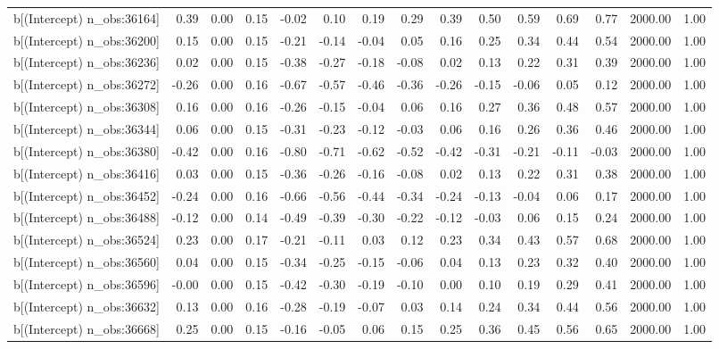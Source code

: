 \begin{table}[ht]
\begin{tabular}{rrrrrrrrrrrrrrr}
  b[(Intercept) n\_obs:36164] & 0.39 & 0.00 & 0.15 & -0.02 & 0.10 & 0.19 & 0.29 & 0.39 & 0.50 & 0.59 & 0.69 & 0.77 & 2000.00 & 1.00 \\ 
  b[(Intercept) n\_obs:36200] & 0.15 & 0.00 & 0.15 & -0.21 & -0.14 & -0.04 & 0.05 & 0.16 & 0.25 & 0.34 & 0.44 & 0.54 & 2000.00 & 1.00 \\ 
  b[(Intercept) n\_obs:36236] & 0.02 & 0.00 & 0.15 & -0.38 & -0.27 & -0.18 & -0.08 & 0.02 & 0.13 & 0.22 & 0.31 & 0.39 & 2000.00 & 1.00 \\ 
  b[(Intercept) n\_obs:36272] & -0.26 & 0.00 & 0.16 & -0.67 & -0.57 & -0.46 & -0.36 & -0.26 & -0.15 & -0.06 & 0.05 & 0.12 & 2000.00 & 1.00 \\ 
  b[(Intercept) n\_obs:36308] & 0.16 & 0.00 & 0.16 & -0.26 & -0.15 & -0.04 & 0.06 & 0.16 & 0.27 & 0.36 & 0.48 & 0.57 & 2000.00 & 1.00 \\ 
  b[(Intercept) n\_obs:36344] & 0.06 & 0.00 & 0.15 & -0.31 & -0.23 & -0.12 & -0.03 & 0.06 & 0.16 & 0.26 & 0.36 & 0.46 & 2000.00 & 1.00 \\ 
  b[(Intercept) n\_obs:36380] & -0.42 & 0.00 & 0.16 & -0.80 & -0.71 & -0.62 & -0.52 & -0.42 & -0.31 & -0.21 & -0.11 & -0.03 & 2000.00 & 1.00 \\ 
  b[(Intercept) n\_obs:36416] & 0.03 & 0.00 & 0.15 & -0.36 & -0.26 & -0.16 & -0.08 & 0.02 & 0.13 & 0.22 & 0.31 & 0.38 & 2000.00 & 1.00 \\ 
  b[(Intercept) n\_obs:36452] & -0.24 & 0.00 & 0.16 & -0.66 & -0.56 & -0.44 & -0.34 & -0.24 & -0.13 & -0.04 & 0.06 & 0.17 & 2000.00 & 1.00 \\ 
  b[(Intercept) n\_obs:36488] & -0.12 & 0.00 & 0.14 & -0.49 & -0.39 & -0.30 & -0.22 & -0.12 & -0.03 & 0.06 & 0.15 & 0.24 & 2000.00 & 1.00 \\ 
  b[(Intercept) n\_obs:36524] & 0.23 & 0.00 & 0.17 & -0.21 & -0.11 & 0.03 & 0.12 & 0.23 & 0.34 & 0.43 & 0.57 & 0.68 & 2000.00 & 1.00 \\ 
  b[(Intercept) n\_obs:36560] & 0.04 & 0.00 & 0.15 & -0.34 & -0.25 & -0.15 & -0.06 & 0.04 & 0.13 & 0.23 & 0.32 & 0.40 & 2000.00 & 1.00 \\ 
  b[(Intercept) n\_obs:36596] & -0.00 & 0.00 & 0.15 & -0.42 & -0.30 & -0.19 & -0.10 & 0.00 & 0.10 & 0.19 & 0.29 & 0.41 & 2000.00 & 1.00 \\ 
  b[(Intercept) n\_obs:36632] & 0.13 & 0.00 & 0.16 & -0.28 & -0.19 & -0.07 & 0.03 & 0.14 & 0.24 & 0.34 & 0.44 & 0.56 & 2000.00 & 1.00 \\ 
  b[(Intercept) n\_obs:36668] & 0.25 & 0.00 & 0.15 & -0.16 & -0.05 & 0.06 & 0.15 & 0.25 & 0.36 & 0.45 & 0.56 & 0.65 & 2000.00 & 1.00 \\ 

\end{tabular}
\end{table}
